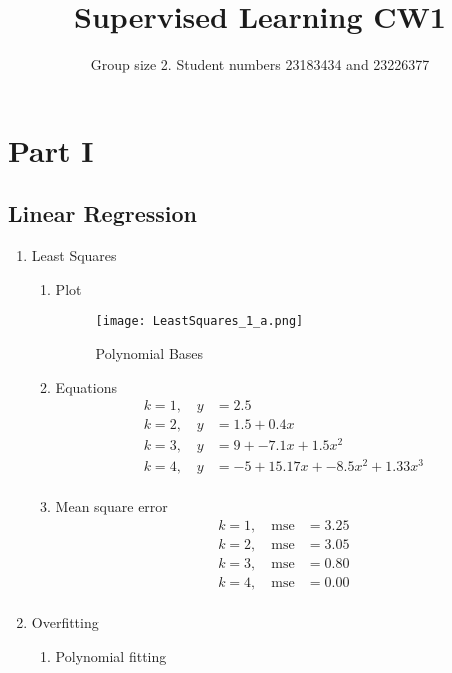 \documentclass{article}
\title{Supervised Learning CW1}
\author{Group size 2. Student numbers 23183434 and 23226377}
\begin{document}
\maketitle


\section{Part I}
\subsection{Linear Regression}
\begin{enumerate}
  \item Least Squares
    \begin{enumerate}[label=\alph*.]
      \item Plot
        \begin{figure}[H]
            \centering
            \texttt{[image: LeastSquares\_1\_a.png]}
            \caption{\label{fig:LeastSquares_1_a}Polynomial Bases}
        \end{figure}
      \item Equations
      \begin{align*}
            k=1, \quad y &= 2.5\\
            k=2, \quad y &= 1.5 + 0.4x \\
            k=3, \quad y &= 9 + -7.1x + 1.5x^2 \\
            k=4, \quad y &= -5 + 15.17x + -8.5x^2 + 1.33x^3 \\
      \end{align*}
      \item Mean square error
      \begin{align*}
            k=1, \quad \text{mse} &= 3.25 \\
            k=2, \quad \text{mse} &= 3.05 \\
            k=3, \quad \text{mse} &= 0.80 \\
            k=4, \quad \text{mse} &= 0.00 \\
      \end{align*}
    \end{enumerate}
  \item Overfitting
    \begin{enumerate}[label=\alph*.]
      \item Polynomial fitting

\end{enumerate}
\end{enumerate}
\end{document}
